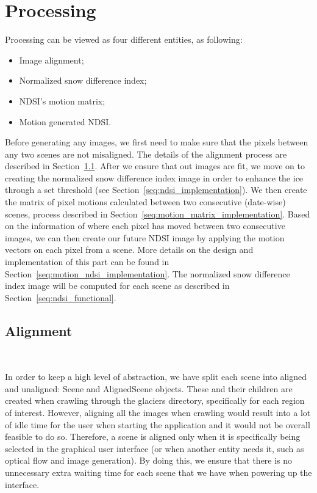 \documentclass[12pt, a4paper]{report}
\begin{document}
	\section{Processing}
	\label{seq:processing}
	
	\par Processing can be viewed as four different entities, as following:
	
	\begin{itemize}
		\item Image alignment;
		\item Normalized snow difference index;
		\item NDSI's motion matrix;
		\item Motion generated NDSI.
	\end{itemize}

	\par Before generating any images, we first need to make sure that the pixels between any two scenes are not misaligned. The details of the alignment process are described in Section~\ref{seq:alignment_implementation}. After we ensure that out images are fit, we move on to creating the normalized snow difference index image in order to enhance the ice through a set threshold (see Section~\ref{seq:ndsi_implementation}). We then create the matrix of pixel motions calculated between two consecutive (date-wise) scenes, process described in Section~\ref{seq:motion_matrix_implementation}. Based on the information of where each pixel has moved between two consecutive images, we can then create our future NDSI image by applying the motion vectors on each pixel from a scene. More details on the design and implementation of this part can be found in Section~\ref{seq:motion_ndsi_implementation}.
	The normalized snow difference index image will be computed for each scene as described in Section~\ref{seq:ndsi_functional}.
	
	
	\subsection{Alignment}
	\label{seq:alignment_implementation}\
	
	\par In order to keep a high level of abstraction, we have split each scene into aligned and unaligned: Scene and AlignedScene objects. These and their children are created when crawling through the glaciers directory, specifically for each region of interest. However, aligning all the images when crawling would result into a lot of idle time for the user when starting the application and it would not be overall feasible to do so. Therefore, a scene is aligned only when it is specifically being selected in the graphical user interface (or when another entity needs it, such as optical flow and image generation). By doing this, we ensure that there is no unnecessary extra waiting time for each scene that we have when powering up the interface.
	
\end{document}
